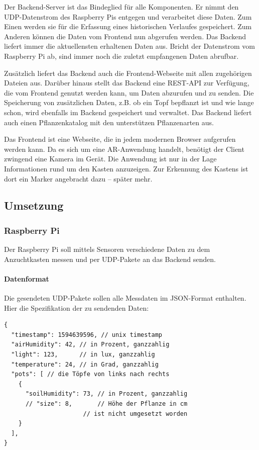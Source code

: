 Der Backend-Server ist das Bindeglied für alle Komponenten. Er nimmt den
UDP-Datenstrom des Raspberry Pis entgegen und verarbeitet diese Daten.
Zum Einen werden sie für die Erfassung eines historischen Verlaufes
gespeichert. Zum Anderen können die Daten vom Frontend nun abgerufen
werden. Das Backend liefert immer die aktuellensten erhaltenen Daten
aus. Bricht der Datenstrom vom Raspberry Pi ab, sind immer noch die
zuletzt empfangenen Daten abrufbar.

Zusätzlich liefert das Backend auch die Frontend-Webseite mit allen
zugehörigen Dateien aus. Darüber hinaus stellt das Backend eine REST-API
zur Verfügung, die vom Frontend genutzt werden kann, um Daten abzurufen
und zu senden. Die Speicherung von zusätzlichen Daten, z.B. ob ein Topf
bepflanzt ist und wie lange schon, wird ebenfalls im Backend gespeichert
und verwaltet. Das Backend liefert auch einen Pflanzenkatalog mit den
unterstützen Pflanzenarten aus.

Das Frontend ist eine Webseite, die in jedem modernen Browser aufgerufen
werden kann. Da es sich um eine AR-Anwendung handelt, benötigt der
Client zwingend eine Kamera im Gerät. Die Anwendung ist nur in der Lage
Informationen rund um den Kasten anzuzeigen. Zur Erkennung des Kastens
ist dort ein Marker angebracht dazu -- später mehr.

\hypertarget{umsetzung}{%
\subsection{Umsetzung}\label{umsetzung}}

\hypertarget{raspberry-pi}{%
\subsubsection{Raspberry Pi}\label{raspberry-pi}}

Der Raspberry Pi soll mittels Sensoren verschiedene Daten zu dem
Anzuchtkasten messen und per UDP-Pakete an das Backend senden.

\hypertarget{datenformat}{%
\paragraph{Datenformat}\label{datenformat}}

Die gesendeten UDP-Pakete sollen alle Messdaten im JSON-Format
enthalten. Hier die Spezifikation der zu sendenden Daten:

\begin{verbatim}
{
  "timestamp": 1594639596, // unix timestamp
  "airHumidity": 42, // in Prozent, ganzzahlig
  "light": 123,      // in lux, ganzzahlig
  "temperature": 24, // in Grad, ganzzahlig
  "pots": [ // die Töpfe von links nach rechts
    {
      "soilHumidity": 73, // in Prozent, ganzzahlig
      // "size": 8,       // Höhe der Pflanze in cm
                      // ist nicht umgesetzt worden
    }
  ],
}
\end{verbatim}

